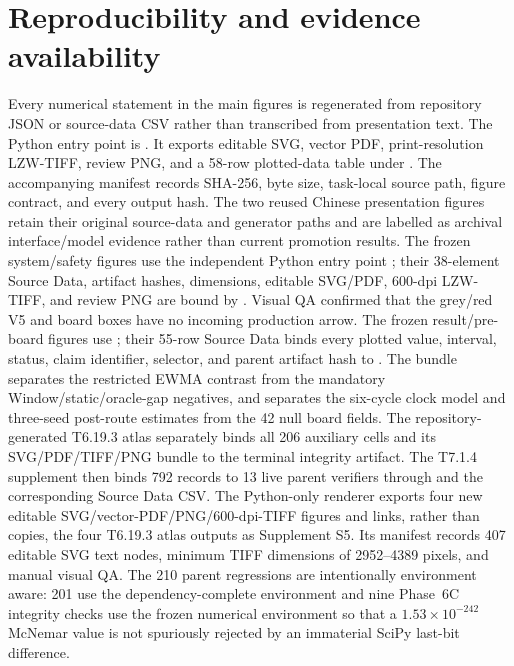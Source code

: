 \documentclass[11pt]{article}
\begin{document}
\section{Reproducibility and evidence availability}

Every numerical statement in the main figures is regenerated from repository
JSON or source-data CSV rather than transcribed from presentation text.  The
Python entry point is
.  It exports editable
SVG, vector PDF, print-resolution LZW-TIFF, review PNG, and a 58-row plotted-data
table under .  The accompanying
manifest records SHA-256, byte size, task-local source path, figure contract,
and every output hash.  The two reused Chinese presentation figures retain
their original source-data and generator paths and are labelled as archival
interface/model evidence rather than current promotion results.
The frozen system/safety figures use the independent Python entry point
; their 38-element Source Data,
artifact hashes, dimensions, editable SVG/PDF, 600-dpi LZW-TIFF, and review PNG
are bound by .  Visual QA confirmed
that the grey/red V5 and board boxes have no incoming production arrow.
The frozen result/pre-board figures use
; their 55-row Source Data binds
every plotted value, interval, status, claim identifier, selector, and parent
artifact hash to .  The
bundle separates the restricted EWMA contrast from the mandatory
Window/static/oracle-gap negatives, and separates the six-cycle clock model
and three-seed post-route estimates from the 42 null board fields.
The repository-generated T6.19.3 atlas separately binds all 206 auxiliary cells
and its SVG/PDF/TIFF/PNG bundle to the terminal integrity artifact.
The T7.1.4 supplement then binds 792 records to 13 live parent verifiers through
 and the corresponding
Source Data CSV.  The Python-only renderer exports four new editable
SVG/vector-PDF/PNG/600-dpi-TIFF figures and links, rather than copies, the four
T6.19.3 atlas outputs as Supplement S5.  Its manifest records 407 editable SVG
text nodes, minimum TIFF dimensions of 2952--4389 pixels, and manual visual
QA.  The 210 parent regressions are intentionally environment aware: 201 use
the dependency-complete environment and nine Phase~6C integrity checks use the
frozen numerical environment so that a $1.53\times10^{-242}$ McNemar value is
not spuriously rejected by an immaterial SciPy last-bit difference.
\end{document}
